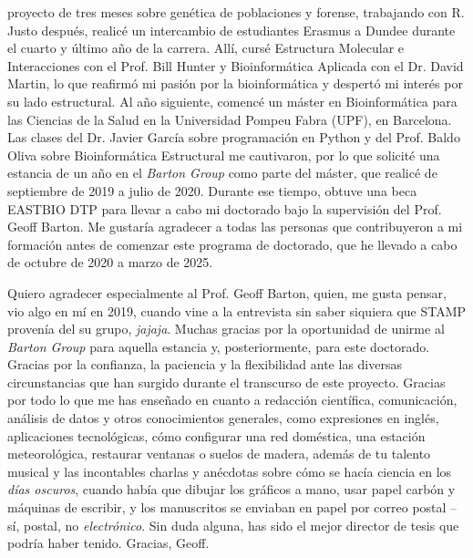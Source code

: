 proyecto de tres meses sobre genética de poblaciones y forense, trabajando con R. Justo después, realicé un intercambio de estudiantes Erasmus a Dundee durante el cuarto y último año de la carrera. Allí, cursé Estructura Molecular e Interacciones con el Prof. Bill Hunter y Bioinformática Aplicada con el Dr. David Martin, lo que reafirmó mi pasión por la bioinformática y despertó mi interés por su lado estructural. Al año siguiente, comencé un máster en Bioinformática para las Ciencias de la Salud en la Universidad Pompeu Fabra (UPF), en Barcelona. Las clases del Dr. Javier García sobre programación en Python y del Prof. Baldo Oliva sobre Bioinformática Estructural me cautivaron, por lo que solicité una estancia de un año en el \textit{Barton Group} como parte del máster, que realicé de septiembre de 2019 a julio de 2020. Durante ese tiempo, obtuve una beca EASTBIO DTP para llevar a cabo mi doctorado bajo la supervisión del Prof. Geoff Barton. Me gustaría agradecer a todas las personas que contribuyeron a mi formación antes de comenzar este programa de doctorado, que he llevado a cabo de octubre de 2020 a marzo de 2025.

Quiero agradecer especialmente al Prof. Geoff Barton, quien, me gusta pensar, vio algo en mí en 2019, cuando vine a la entrevista sin saber siquiera que STAMP provenía del su grupo, \textit{jajaja}. Muchas gracias por la oportunidad de unirme al \textit{Barton Group} para aquella estancia y, posteriormente, para este doctorado. Gracias por la confianza, la paciencia y la flexibilidad ante las diversas circunstancias que han surgido durante el transcurso de este proyecto. Gracias por todo lo que me has enseñado en cuanto a redacción científica, comunicación, análisis de datos y otros conocimientos generales, como expresiones en inglés, aplicaciones tecnológicas, cómo configurar una red doméstica, una estación meteorológica, restaurar ventanas o suelos de madera, además de tu talento musical y las incontables charlas y anécdotas sobre cómo se hacía ciencia en los \textit{días oscuros}, cuando había que dibujar los gráficos a mano, usar papel carbón y máquinas de escribir, y los manuscritos se enviaban en papel por correo postal -- sí, postal, no \textit{electrónico}. Sin duda alguna, has sido el mejor director de tesis que podría haber tenido. Gracias, Geoff.

